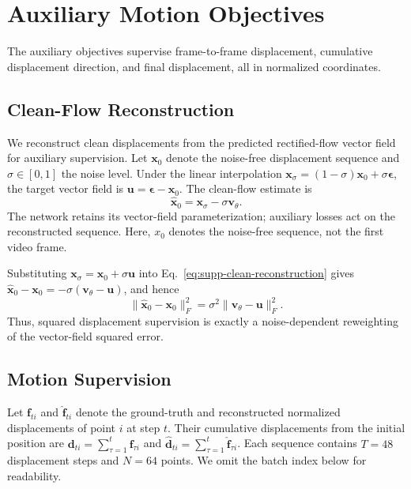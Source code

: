 \section{Auxiliary Motion Objectives}
\label{sec:supp-aux}

The auxiliary objectives supervise frame-to-frame displacement,
cumulative displacement direction, and final displacement,
all in normalized coordinates.

\subsection{Clean-Flow Reconstruction}

We reconstruct clean displacements from the predicted rectified-flow
vector field for auxiliary supervision. Let $\mathbf{x}_0$ denote the
noise-free displacement sequence and $\sigma\in[0,1]$ the noise level.
Under the linear interpolation
$\mathbf{x}_{\sigma}=(1-\sigma)\mathbf{x}_0+\sigma\boldsymbol{\epsilon}$,
the target vector field is
$\mathbf{u}=\boldsymbol{\epsilon}-\mathbf{x}_0$.
The clean-flow estimate is
\begin{equation}
\widehat{\mathbf{x}}_0
=\mathbf{x}_{\sigma}-\sigma\mathbf{v}_{\theta}.
\label{eq:supp-clean-reconstruction}
\end{equation}
The network retains its vector-field parameterization;
auxiliary losses act on the reconstructed sequence.
Here, $x_0$ denotes the noise-free sequence, not the first video frame.

Substituting $\mathbf{x}_{\sigma}=\mathbf{x}_0+\sigma\mathbf{u}$
into Eq.~\eqref{eq:supp-clean-reconstruction} gives
$\widehat{\mathbf{x}}_0-\mathbf{x}_0
=-\sigma(\mathbf{v}_{\theta}-\mathbf{u})$, and hence
\begin{equation}
\|\widehat{\mathbf{x}}_0-\mathbf{x}_0\|_F^2
=\sigma^2\|\mathbf{v}_{\theta}-\mathbf{u}\|_F^2.
\label{eq:supp-clean-error}
\end{equation}
Thus, squared displacement supervision is exactly a noise-dependent
reweighting of the vector-field squared error.

\subsection{Motion Supervision}

Let $\mathbf{f}_{ti}$ and $\widehat{\mathbf{f}}_{ti}$ denote the
ground-truth and reconstructed normalized displacements of point $i$
at step $t$. Their cumulative displacements from the initial position
are $\mathbf{d}_{ti}=\sum_{\tau=1}^{t}\mathbf{f}_{\tau i}$ and
$\widehat{\mathbf{d}}_{ti}
=\sum_{\tau=1}^{t}\widehat{\mathbf{f}}_{\tau i}$.
Each sequence contains $T=48$ displacement steps and $N=64$ points.
We omit the batch index below for readability.

